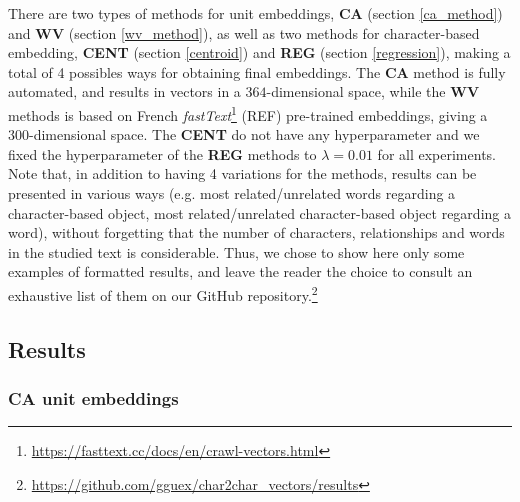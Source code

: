 \documentclass[
twocolumn,
]{ceurart}
\begin{document}
There are two types of methods for unit embeddings, \textbf{CA} (section \ref{ca_method}) and \textbf{WV} (section \ref{wv_method}), as well as two methods for character-based embedding, \textbf{CENT} (section \ref{centroid}) and \textbf{REG} (section \ref{regression}), making a total of 4 possibles ways for obtaining final embeddings. The \textbf{CA} method is fully automated, and results in vectors in a $364$-dimensional space, while the $\textbf{WV}$ methods is based on French \emph{fastText}\footnote{\url{https://fasttext.cc/docs/en/crawl-vectors.html}} (REF) pre-trained embeddings, giving a $300$-dimensional space. The \textbf{CENT} do not have any hyperparameter and we fixed the hyperparameter of the \textbf{REG} methods to $\lambda = 0.01$ for all experiments. \\
Note that, in addition to having 4 variations for the methods, results can be presented in various ways (e.g. most related/unrelated words regarding a character-based object, most related/unrelated character-based object regarding a word), without forgetting that the number of characters, relationships and words in the studied text is considerable. Thus, we chose to show here only some examples of formatted results, and leave the reader the choice to consult an exhaustive list of them on our GitHub repository.\footnote{\url{https://github.com/gguex/char2char_vectors/results}}

\subsection{Results}

\subsubsection{CA unit embeddings}
\end{document}
